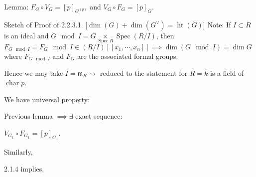 \documentclass{article}
\theoremstyle{definition}
\numberwithin{theorem}{subsection}
\begin{document}
    Lemma: \(F_G \circ V_G = [p]_{G^{(p)}}\) and \(V_G \circ F_G = [p]_G\).

    Sketch of Proof of 2.2.3.1. [\(\dim(G) + \dim(G^\vee) = \operatorname{ht} (G)\)] Note: If \(I \subset R\) is an ideal and \(G \mod I = G \underset{\operatorname{Spec} R}{\times} \operatorname{Spec}(R / I)\), then \(F_{G\mod I} = F_G \mod I \in (R / I)[[x_1, \cdots , x_n]] \implies \dim (G \mod I) = \dim G\) where \(F_{G\mod I}\) and \(F_G\) are the associated formal groups.
    
    Hence we may take \(I = \mathfrak{m}_R \rightsquigarrow\) reduced to the statement for \(R = k\) is a field of \(\operatorname{char} p\).

    We have universal property:

    \begin{center}
    \end{center}

    Previous lemma \(\implies \exists\) exact sequence:

    \begin{center}
    \end{center}

    \(V_{G_1} \circ  F_{G_1} = [p]_{G_1}\).

    Similarly,

    \begin{center}
    \end{center}

    2.1.4 implies,

    \begin{center}
    \end{center}
\end{document}
